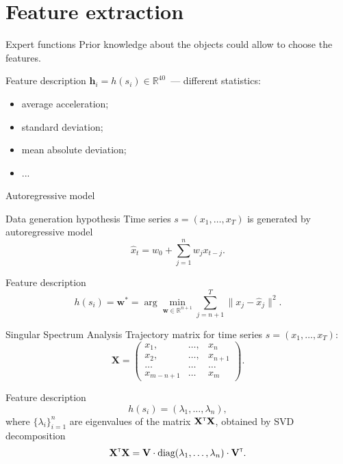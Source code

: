 \documentclass{beamer}
\newcommand{\T}{{\text{\tiny\sffamily\upshape\mdseries T}}}
\begin{document}
\section{Feature extraction}
\begin{frame}{Expert functions}
	Prior knowledge about the objects could allow to choose the features.
	\begin{block}{Feature description}
		$\mathbf{h}_i = h(s_i)\in \mathbb{R}^{40}$~--- different statistics:
		\begin{itemize}
			\item average acceleration;
			\item standard deviation;
			\item mean absolute deviation;
			\item ...
		\end{itemize}
	\end{block}

\end{frame}
\begin{frame}{Autoregressive model}
	\begin{block}{Data generation hypothesis}
		Time series $s = (x_1, \dots, x_T)$ is generated by autoregressive model
		\[
			\hat{x}_t = w_0 + \sum_{j=1}^n w_j x_{t-j}.
		\]
	\end{block}
	
	\begin{block}{Feature description}
		\[
			h(s_i) = \mathbf{w}^* = \arg \min_{\mathbf{w} \in \mathbb{R}^{n+1}} \sum_{j=n+1}^{T} \| x_j - \hat{x}_j \|^2.
		\]
	\end{block}
\end{frame}
\begin{frame}{Singular Spectrum Analysis}
	Trajectory matrix for time series $s = (x_1, \dots, x_T)$:
	\[
		\mathbf{X} = 
		\begin{pmatrix}
			x_1, & \dots, & x_n \\
			x_2, & \dots, & x_{n+1} \\
			\dots & \dots & \dots \\
			x_{m-n+1} & \dots & x_{m}
		\end{pmatrix}.
	\]
	
	\begin{block}{Feature description}
		\[
			h(s_i) = (\lambda_1, \dots ,\lambda_n),
		\]
		where $\{\lambda_i\}_{i=1}^n$ are eigenvalues of the matrix $\mathbf{X}^{\T} \mathbf{X}$, obtained by SVD decomposition
		\[
			\mathbf{X}^{\T} \mathbf{X} = \mathbf{V} \cdot \text{diag} (\lambda_1, \dots, \lambda_n) \cdot \mathbf{V}^{\T}.
		\]
	\end{block}

\end{frame}
\end{document}
